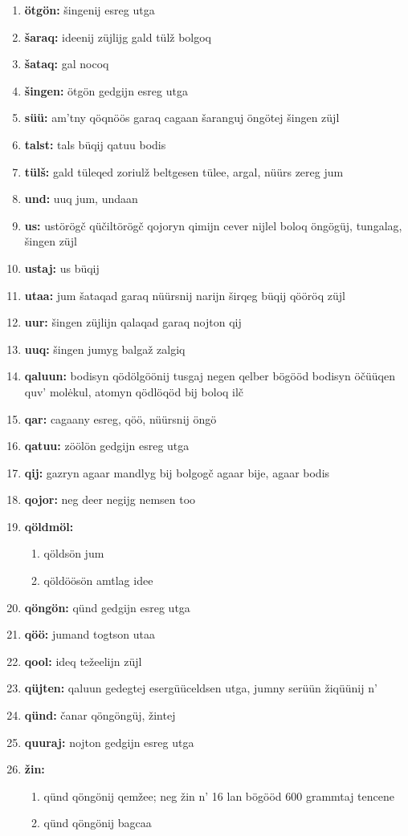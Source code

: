 \begin{enumerate}
\item\textbf{ötgön:} šingenij esreg utga
\item\textbf{šaraq:} ideenij züjlijg gald tülž bolgoq
\item\textbf{šataq:} gal nocoq
\item\textbf{šingen:} ötgön gedgijn esreg utga
\item\textbf{süü:} am’tny qöqnöös garaq cagaan šaranguj öngötej šingen züjl
\item\textbf{talst:} tals büqij qatuu bodis
\item\textbf{tülš:} gald tüleqed zoriulž beltgesen tülee, argal, nüürs zereg jum
\item\textbf{und:} uuq jum, undaan
\item\textbf{us:} ustörögč qüčiltörögč qojoryn qimijn cever nijlel boloq öngögüj, tungalag, šingen züjl
\item\textbf{ustaj:} us büqij
\item\textbf{utaa:} jum šataqad garaq nüürsnij narijn širqeg büqij qööröq züjl
\item\textbf{uur:} šingen züjlijn qalaqad garaq nojton qij
\item\textbf{uuq:} šingen jumyg balgaž zalgiq
\item\textbf{qaluun:} bodisyn qödölgöönij tusgaj negen qelber bögööd bodisyn öčüüqen quv’ molėkul, atomyn qödlöqöd bij boloq ilč
\item\textbf{qar:} cagaany esreg, qöö, nüürsnij öngö
\item\textbf{qatuu:} zöölön gedgijn esreg utga
\item\textbf{qij:} gazryn agaar mandlyg bij bolgogč agaar bije, agaar bodis
\item\textbf{qojor:} neg deer negijg nemsen too
\item\textbf{qöldmöl:}\begin{enumerate}\item qöldsön jum \item qöldöösön amtlag idee\end{enumerate}
\item\textbf{qöngön:} qünd gedgijn esreg utga
\item\textbf{qöö:} jumand togtson utaa
\item\textbf{qool:} ideq težeelijn züjl
\item\textbf{qüjten:} qaluun gedegtej esergüüceldsen utga, jumny serüün žiqüünij n’
\item\textbf{qünd:} čanar qöngöngüj, žintej
\item\textbf{quuraj:} nojton gedgijn esreg utga
\item\textbf{žin:}\begin{enumerate}\item qünd qöngönij qemžee; neg žin n’ 16 lan bögööd 600 grammtaj tencene \item qünd qöngönij bagcaa\end{enumerate}
\end{enumerate}

